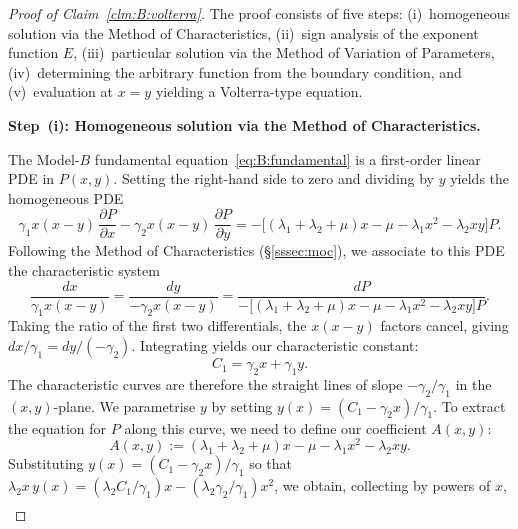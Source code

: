 \begin{proof}[Proof of Claim~\ref{clm:B:volterra}]
    The proof consists of five steps: (i)~homogeneous solution via the Method of Characteristics, (ii)~sign analysis of the exponent function $E$, (iii)~particular solution via the Method of Variation of Parameters, (iv)~determining the arbitrary function from the boundary condition, and (v)~evaluation at $x=y$ yielding a Volterra-type equation.
    
    \medskip\noindent\textbf{Step~(i): Homogeneous solution via the Method of Characteristics.}
    
    The Model-$B$ fundamental equation~\eqref{eq:B:fundamental} is a first-order
    linear PDE in $P(x,y)$. Setting the
    right-hand side to zero and dividing by $y$ yields the homogeneous PDE
    \begin{equation*}
        \gamma_1 x(x-y)\,\frac{\partial P}{\partial x}
        - \gamma_2 x(x-y)\,\frac{\partial P}{\partial y}
        = -\bigl[(\lambda_1+\lambda_2+\mu)x - \mu - \lambda_1 x^2
                 - \lambda_2 xy\bigr]P.
    \end{equation*}
    Following the Method of Characteristics (\S\ref{sssec:moc}), we associate to this PDE the characteristic system
    \begin{equation*}
        \frac{dx}{\gamma_1 x(x-y)}
        = \frac{dy}{-\gamma_2 x(x-y)}
        = \frac{dP}{-\bigl[(\lambda_1+\lambda_2+\mu)x - \mu - \lambda_1 x^2 - \lambda_2 xy\bigr]P}.
    \end{equation*}
    Taking the ratio of the first two differentials, the $x(x-y)$ factors cancel, giving $dx/\gamma_1 = dy/(-\gamma_2)$.  Integrating yields our characteristic constant:
    \begin{equation*}
        C_1 = \gamma_2 x + \gamma_1 y.
    \end{equation*}
    The characteristic curves are therefore the straight lines of slope $-\gamma_2/\gamma_1$ in the $(x,y)$-plane. We parametrise $y$ by setting $y(x) = (C_1-\gamma_2 x)/\gamma_1$. To extract the equation for $P$ along this curve, we need to define our coefficient $A(x,y)$:
    \begin{equation}
        A(x,y) := (\lambda_1+\lambda_2+\mu)x - \mu - \lambda_1 x^2 - \lambda_2 xy.
        \label{eq:B:Adef}
    \end{equation}
    Substituting $y(x) = (C_1-\gamma_2 x)/\gamma_1$ so that $\lambda_2 x\,y(x) = (\lambda_2 C_1/\gamma_1)x - (\lambda_2\gamma_2/\gamma_1)x^2$, we obtain, collecting by powers of $x$,
    \begin{align*}

\end{align*}
\end{proof}
